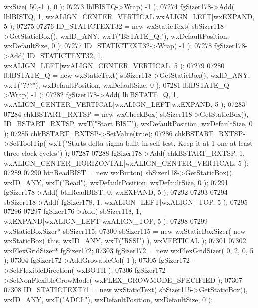 \begin{DoxyCode}
      wxSize( 50,-1 ), 0 );
07273     lblBISTQ->Wrap( -1 );
07274     fgSizer178->Add( lblBISTQ, 1, wxALIGN\_CENTER\_VERTICAL|wxALIGN\_LEFT|wxEXPAND, 5 );
07275     
07276     ID_STATICTEXT32 = \textcolor{keyword}{new} wxStaticText( sbSizer118->GetStaticBox(), wxID\_ANY, wxT(\textcolor{stringliteral}{"BSTATE\_Q:"}), 
      wxDefaultPosition, wxDefaultSize, 0 );
07277     ID_STATICTEXT32->Wrap( -1 );
07278     fgSizer178->Add( ID_STATICTEXT32, 1, wxALIGN\_LEFT|wxALIGN\_CENTER\_VERTICAL, 5 );
07279     
07280     lblBSTATE_Q = \textcolor{keyword}{new} wxStaticText( sbSizer118->GetStaticBox(), wxID\_ANY, wxT(\textcolor{stringliteral}{"???"}), wxDefaultPosition, 
      wxDefaultSize, 0 );
07281     lblBSTATE_Q->Wrap( -1 );
07282     fgSizer178->Add( lblBSTATE_Q, 1, wxALIGN\_CENTER\_VERTICAL|wxALIGN\_LEFT|wxEXPAND, 5 );
07283     
07284     chkBSTART_RXTSP = \textcolor{keyword}{new} wxCheckBox( sbSizer118->GetStaticBox(), 
      ID_BSTART_RXTSP, wxT(\textcolor{stringliteral}{"Start BIST"}), wxDefaultPosition, wxDefaultSize, 0 );
07285     chkBSTART_RXTSP->SetValue(\textcolor{keyword}{true}); 
07286     chkBSTART_RXTSP->SetToolTip( wxT(\textcolor{stringliteral}{"Starts delta sigma built in self test. Keep it at 1 one at least
       three clock cycles"}) );
07287     
07288     fgSizer178->Add( chkBSTART_RXTSP, 1, wxALIGN\_CENTER\_HORIZONTAL|wxALIGN\_CENTER\_VERTICAL, 5 );
07289     
07290     btnReadBIST = \textcolor{keyword}{new} wxButton( sbSizer118->GetStaticBox(), wxID\_ANY, wxT(\textcolor{stringliteral}{"Read"}), wxDefaultPosition, 
      wxDefaultSize, 0 );
07291     fgSizer178->Add( btnReadBIST, 0, wxEXPAND, 5 );
07292     
07293     
07294     sbSizer118->Add( fgSizer178, 1, wxALIGN\_LEFT|wxALIGN\_TOP, 5 );
07295     
07296     
07297     fgSizer176->Add( sbSizer118, 1, wxEXPAND|wxALIGN\_LEFT|wxALIGN\_TOP, 5 );
07298     
07299     wxStaticBoxSizer* sbSizer115;
07300     sbSizer115 = \textcolor{keyword}{new} wxStaticBoxSizer( \textcolor{keyword}{new} wxStaticBox( \textcolor{keyword}{this}, wxID\_ANY, wxT(\textcolor{stringliteral}{"RSSI"}) ), wxVERTICAL );
07301     
07302     wxFlexGridSizer* fgSizer172;
07303     fgSizer172 = \textcolor{keyword}{new} wxFlexGridSizer( 0, 2, 0, 5 );
07304     fgSizer172->AddGrowableCol( 1 );
07305     fgSizer172->SetFlexibleDirection( wxBOTH );
07306     fgSizer172->SetNonFlexibleGrowMode( wxFLEX\_GROWMODE\_SPECIFIED );
07307     
07308     ID_STATICTEXT71 = \textcolor{keyword}{new} wxStaticText( sbSizer115->GetStaticBox(), wxID\_ANY, wxT(\textcolor{stringliteral}{"ADCI:"}), 
      wxDefaultPosition, wxDefaultSize, 0 );

\end{DoxyCode}
